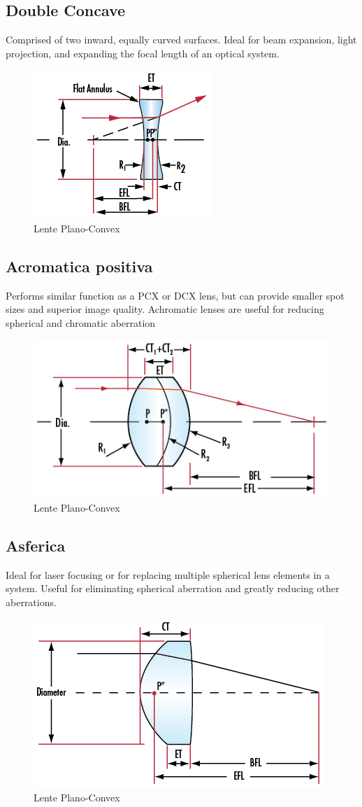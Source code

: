 \subsection{Double Concave}
Comprised of two inward, equally curved surfaces. Ideal for beam expansion, light projection, and expanding the focal length of an optical system. 
\begin{figure}[!ht]
\centering

\includegraphics[width=.3\textwidth]{img/double-concave.png}

\caption{Lente Plano-Convex}
\label{fig:ccd-blockdiagram}
\end{figure}

\subsection{Acromatica positiva}
Performs similar function as a PCX or DCX lens, but can provide smaller spot sizes and superior image quality. Achromatic lenses are useful for reducing spherical and chromatic aberration
\begin{figure}[!ht]
\centering

\includegraphics[width=.3\textwidth]{img/positiva-acromatica.png}

\caption{Lente Plano-Convex}
\label{fig:ccd-blockdiagram}
\end{figure}

\subsection{Asferica}
Ideal for laser focusing or for replacing multiple spherical lens elements in a system. Useful for eliminating spherical aberration and greatly reducing other aberrations.

\begin{figure}[!ht]
\centering

\includegraphics[width=.3\textwidth]{img/asferica.png}

\caption{Lente Plano-Convex}
\label{fig:ccd-blockdiagram}
\end{figure}



